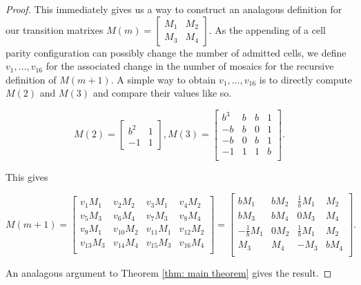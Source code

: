 \documentclass[12pt]{article}
\newtheorem{theorem}{Theorem}
\theoremstyle{plain}
\theoremstyle{definition}
\theoremstyle{remark}
\theoremstyle{definition}
\begin{document}
\begin{proof}
This immediately gives us a way to construct an analagous definition for our transition matrixes $M(m) = \begin{bmatrix} M_1 & M_2 \\ M_3 & M_4 \end{bmatrix}$. As the appending of a cell parity configuration can possibly change the number of admitted cells, we define $v_{1} ,\dots, v_{16}$ for the associated change in the number of mosaics for the recursive definition of $M(m+1)$. A simple way to obtain $v_{1} ,\dots, v_{16}$ is to directly compute $M(2)$ and $M(3)$ and compare their values like so.

$$M(2) = 
\begin{bmatrix}
    b^2 & 1 \\
    -1 & 1
\end{bmatrix}, M(3)=
\begin{bmatrix}
b^3 & b & b & 1 \\
-b & b & 0 & 1 \\
-b & 0 & b & 1 \\
-1 & 1 & 1 & b \\
\end{bmatrix}.$$

This gives

$$
M(m+1) = 
\begin{bmatrix}
    v_{1}M_1 & v_{2}M_2 & v_{3}M_1 & v_{4}M_2 \\
    v_{5}M_3 & v_{6}M_4 & v_{7}M_3 & v_{8}M_4 \\
    v_{9}M_1 & v_{10}M_2 & v_{11}M_1 & v_{12}M_2 \\
    v_{13}M_3 & v_{14}M_4 & v_{15}M_3 & v_{16}M_4 \\
\end{bmatrix} =
\begin{bmatrix}
bM_1 & bM_2 & \frac{1}{b}M_1 & M_2 \\
bM_3 & bM_4 & 0M_3 & M_4 \\
-\frac{1}{b}M_1 & 0M_2 & \frac{1}{b}M_1 & M_2 \\
M_3 & M_4 & -M_3 & bM_4 \\
\end{bmatrix}.
$$

An analagous argument to Theorem \ref{thm: main theorem} gives the result.

\end{proof}

\end{document}
